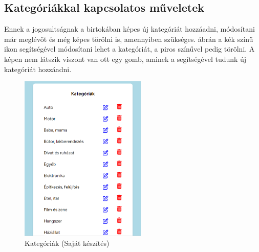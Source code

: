 \documentclass[]{thesis-ekf}
\theoremstyle{definition}
\theoremstyle{remark}
\begin{document}
	\subsection{Kategóriákkal kapcsolatos műveletek}\label{sc-kategoria}
		Ennek a jogosultságnak a birtokában képes új kategóriát hozzáadni, módosítani már meglévőt és még képes törölni is, amennyiben szükséges.  ábrán a kék színű ikon segítségével módosítani lehet a kategóriát, a piros színűvel pedig törölni. A képen nem látszik viszont van ott egy gomb, aminek a segítségével tudunk új kategóriát hozzáadni.
		\begin{figure}[ht!]
			\centering
			\includegraphics[height=8cm]{./felhasznaloi/kategoria}
			\caption{Kategóriák (Saját készítés)} 
			\label{kategoria-muveletek}
		\end{figure} 
\end{document}
